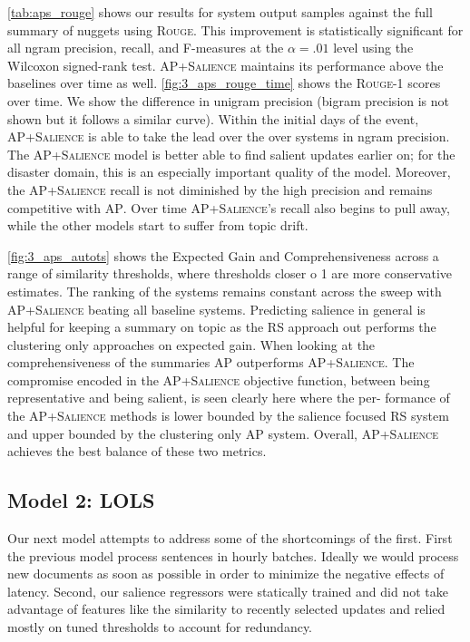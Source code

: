 \autoref{tab:aps_rouge}  shows  our  results  for  system  output
samples against the full summary of nuggets using \textsc{Rouge}. 
This improvement is statistically significant  for  all  ngram  
precision,  recall,  and  F-measures at the
$\alpha=.01$
level using the Wilcoxon
signed-rank test.
\textsc{AP+Salience}
maintains    its    performance
above  the  baselines  over  time  as  well.
\autoref{fig:3_aps_rouge_time}  shows  the  \textsc{Rouge-1}  scores  over  
time.
We  show  the  difference  in  unigram  precision
(bigram  precision  is  not  shown  but  it  follows a
similar  curve).
Within  the  initial  days  of  the
event,  \textsc{AP+Salience}
is  able  to  take  the  lead
over  the  over  systems  in  ngram  precision.   The
\textsc{AP+Salience}
model is better able to find salient
updates earlier on; for the disaster domain, this is
an especially important quality of the model.
Moreover, the \textsc{AP+Salience} recall is not diminished by the high 
precision and remains competitive with \textsc{AP}. 
Over time \textsc{AP+Salience}'s recall also begins to pull away, 
while the other models start to suffer from topic drift.


\autoref{fig:3_aps_autots} shows the Expected Gain and Comprehensiveness 
across a range
of  similarity  thresholds,  where  thresholds  closer
o 1 are more conservative estimates. The ranking
of the systems remains constant across the sweep
with \textsc{AP+Salience}
beating all baseline systems.
Predicting salience in general is helpful for keeping a summary on topic as the  \textsc{RS}  approach out
performs  the  clustering  only  approaches  on  expected gain.
When looking at the comprehensiveness of the
summaries \textsc{AP} outperforms \textsc{AP+Salience}.  
The compromise  encoded  in  the  \textsc{AP+Salience}
objective function, between being representative and
being salient, is seen clearly here where the per-
formance of the \textsc{AP+Salience}
methods is lower
bounded by the salience focused  RS  system and
upper bounded by the clustering only AP system.
Overall, \textsc{AP+Salience}
achieves the best balance
of these two metrics.

    

\subsection{Model 2: LOLS}

Our next model attempts to address some of the shortcomings of the 
first. First the previous model process sentences in hourly batches.
Ideally we would process new documents as soon as possible in order 
to minimize the negative effects of latency. Second, our salience
regressors were statically trained and did not take advantage of features
like the similarity to recently selected updates and relied mostly on
tuned thresholds to account for redundancy. 


